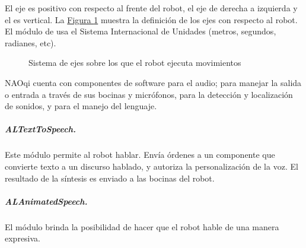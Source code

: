 
El eje  es positivo con respecto al frente del robot, el eje  de
derecha a izquierda y el  es vertical.
La \hyperref[\detokenize{chapter_one/naoqi:almotionaxis}]{Figura \ref{\detokenize{chapter_one/naoqi:almotionaxis}}} muestra la definición de los ejes con respecto al robot.
El módulo de  usa el Sistema Internacional de Unidades (metros,
segundos, radianes, etc).
\begin{figure}[!ht]
\centering
\capstart

\noindent{}
\caption{Sistema de ejes sobre los que el robot ejecuta movimientos}\label{\detokenize{chapter_one/naoqi:almotionaxis}}\end{figure}




NAOqi cuenta con componentes de software para el audio; para
manejar la salida o entrada a través de sus bocinas y micrófonos,
para la detección y localización de sonidos,  y para el manejo del lenguaje.


\subparagraph{ALTextToSpeech.}
\label{\detokenize{chapter_one/naoqi:altexttospeech}}
Este módulo permite al robot hablar. Envía órdenes a un componente que
convierte texto a un discurso hablado, y autoriza la personalización de la voz.
El resultado de la síntesis es enviado a las bocinas del robot.


\subparagraph{ALAnimatedSpeech.}
\label{\detokenize{chapter_one/naoqi:alanimatedspeech}}
El módulo  brinda la posibilidad de hacer que el robot hable
de una manera expresiva.

